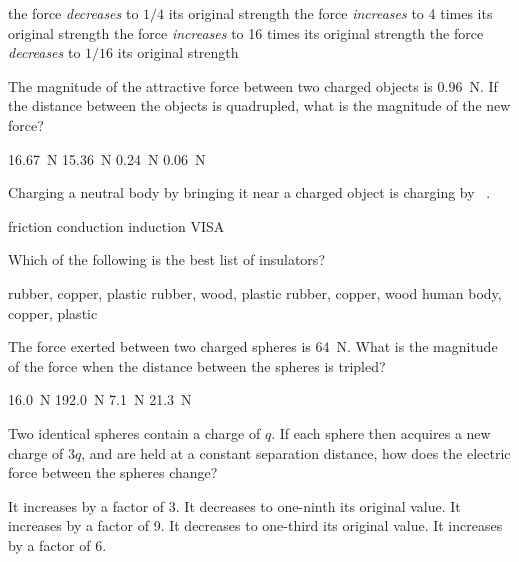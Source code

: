 \documentclass[]{exam}
\begin{document}
\begin{questions}
\begin{choices}
\choice the force \textit{decreases} to $1/4$ its original strength
\choice the force \textit{increases} to 4 times its original strength
\choice the force \textit{increases} to 16 times its original strength
\correctchoice the force \textit{decreases} to $1/16$ its original strength
\end{choices}

\question
The magnitude of the attractive force between two charged objects is \SI{0.96}{N}. If the distance between the objects is quadrupled, what is the magnitude of the new force?

\begin{choices}
\choice \SI{16.67}{N}
\choice \SI{15.36}{N}
\choice \SI{0.24}{N}
\choice \SI{0.06}{N}
\end{choices}

\question
Charging a neutral body by bringing it near a charged object is charging by \fillin\ .

\begin{choices}
\choice friction
\choice conduction
\choice induction
\choice VISA
\end{choices}

\question
Which of the following is the best list of insulators?

\begin{choices}
\choice rubber, copper, plastic 
\choice rubber, wood, plastic
\choice rubber, copper, wood 
\choice human body, copper, plastic
\end{choices}

\question
The force exerted between two charged spheres is \SI{64}{N}. What is the magnitude of the force when the distance between the spheres is tripled?

\begin{choices}
\choice \SI{16.0}{N}
\choice \SI{192.0}{N}
\choice \SI{7.1}{N}
\choice \SI{21.3}{N}
\end{choices}

\question
Two identical spheres contain a charge of $q$. If each sphere then acquires a new charge of $3q$, and are held at a constant separation distance, how does the electric force between the spheres change?

\begin{choices}
\choice It increases by a factor of 3.
\choice It decreases to one-ninth its
original value.
\choice It increases by a factor of 9.
\choice It decreases to one-third its
original value.
\choice It increases by a factor of 6.
\end{choices}


\end{questions}
\end{document}

